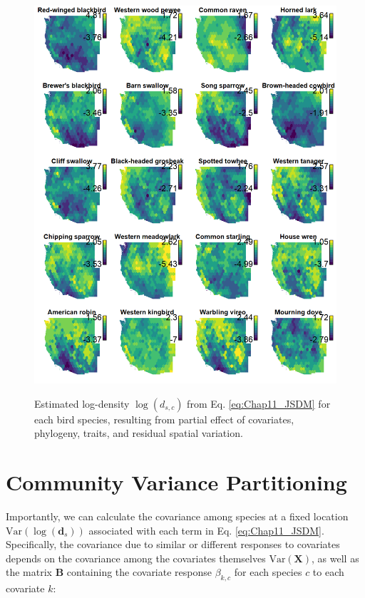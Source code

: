 \begin{figure}[!ht]
    \caption[Predicted density for 20 bird species]{Estimated log-density \(\log(d_{s,c})\) from Eq. \ref{eq:Chap11_JSDM} for each bird species, resulting from partial effect of covariates, phylogeny, traits, and residual spatial variation.}
    \includegraphics[width=5.5in]{Chap_11/Densities.png}
    \label{fig:Chap11_densities}
\end{figure}

\section{Community Variance Partitioning} \label{sec:Chap11_community_variance_partitioning}

Importantly, we can calculate the covariance among species at a fixed location \( \mathrm{Var}(\log(\mathbf{d}_{s})) \) associated with each term in Eq. \ref{eq:Chap11_JSDM}.  Specifically, the covariance due to similar or different responses to covariates depends on the covariance among the covariates themselves \( \mathrm{Var}( \mathbf{X} ) \), as well as the matrix \( \mathbf{B} \) containing the covariate response \(\beta_{k,c}\) for each species \(c\) to each covariate \(k\):


